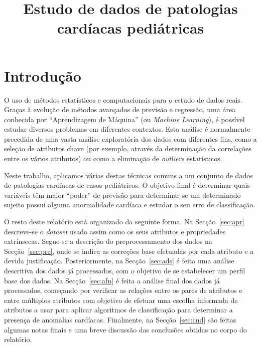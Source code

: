 \documentclass[10pt, conference, compsocconf]{IEEEtran}
\begin{document}
\title{Estudo de dados de patologias cardíacas pediátricas}

\author{
  \and
}

\newcommand{\PreImg}[1]{
  \begin{figure}[H]
    \centering
    \texttt{[image: img/pre\_\#1.png]}
    \caption{Distribuição de {\tt #1} em relação a {\tt nxa}}
    \label{fig:pre#1}
  \end{figure}
}

\maketitle


\section{Introdução}
\label{sec:int}

O uso de métodos estatísticos e computacionais para o estudo de dados
reais. Graças à evolução de métodos avançados de previsão e regressão,
uma área conhecida por ``Aprendizagem de Máquina'' (ou \textit{Machine
  Learning}), é possível estudar diversos problemas em diferentes
contextos. Esta análise é normalmente precedida de uma vasta análise
exploratória dos dados com diferentes fins, como a seleção de
atributos chave (por exemplo, através da determinação da correlações
entre os vários atributos) ou como a eliminação de \textit{outliers}
estatísticos.

Neste trabalho, aplicamos várias destas técnicas comuns a um conjunto
de dados de patologias cardíacas de casos pediátricos. O objetivo
final é determinar quais variáveis têm maior ``poder'' de previsão
para determinar se um determinado sujeito possui alguma anormalidade
cardíaca e estudar o seu erro de classificação.

O resto deste relatório está organizado da seguinte forma. Na
Secção~\ref{sec:apr} descreve-se o \textit{dataset} usado assim como
os seus atributos e propriedades extrínsecas. Segue-se a descrição do
preprocessamento dos dados na Secção~\ref{sec:pre}, onde se indica as
correções base efetuadas por cada atributo e a devida
justificação. Posteriormente, na Secção~\ref{sec:ads} é feita uma
análise descritiva dos dados já processados, com o objetivo de se
estabelecer um perfil base dos dados. Na Secção~\ref{sec:afn} é feita
a análise final dos dados já processados, começando por verificar as
relações entre os pares de atributos e entre múltiplos atributos com
objetivo de efetuar uma escolha informada de atributos a usar para
aplicar algoritmos de classificação para determinar a presença de
anomalias cardíacas. Finalmente, na Secção~\ref{sec:cnd} são feitas
algumas notas finais e uma breve discussão das conclusões obtidas no
corpo do relatório.
\end{document}
